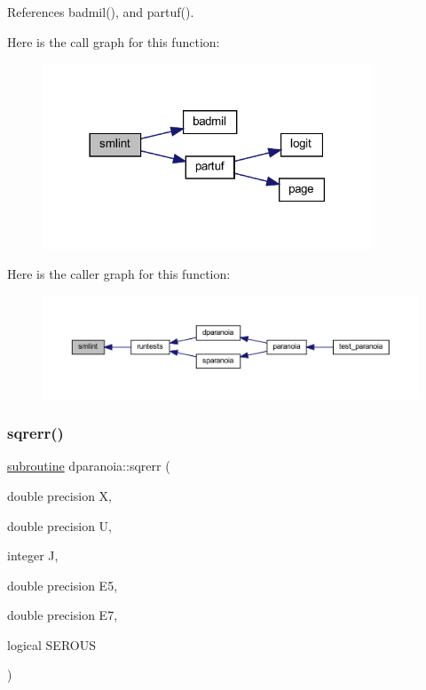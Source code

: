 References badmil(), and partuf().

Here is the call graph for this function\+:
\nopagebreak
\begin{figure}[H]
\begin{center}
\leavevmode
\includegraphics[width=278pt]{dparanoia_8f90_a65decbca56a5900d39f6954e07965116_cgraph}
\end{center}
\end{figure}
Here is the caller graph for this function\+:
\nopagebreak
\begin{figure}[H]
\begin{center}
\leavevmode
\includegraphics[width=350pt]{dparanoia_8f90_a65decbca56a5900d39f6954e07965116_icgraph}
\end{center}
\end{figure}
\mbox{\label{dparanoia_8f90_a0c8227a6d55d254aa7917dc70462539e}} 
\subsubsection{\texorpdfstring{sqrerr()}{sqrerr()}}
{\footnotesize\ttfamily \hyperlink{M__stopwatch_83_8txt_acfbcff50169d691ff02d4a123ed70482}{subroutine} dparanoia\+::sqrerr (\begin{DoxyParamCaption}\item[{double precision}]{X,  }\item[{double precision}]{U,  }\item[{integer}]{J,  }\item[{double precision}]{E5,  }\item[{double precision}]{E7,  }\item[{logical}]{S\+E\+R\+O\+US }\end{DoxyParamCaption})}

